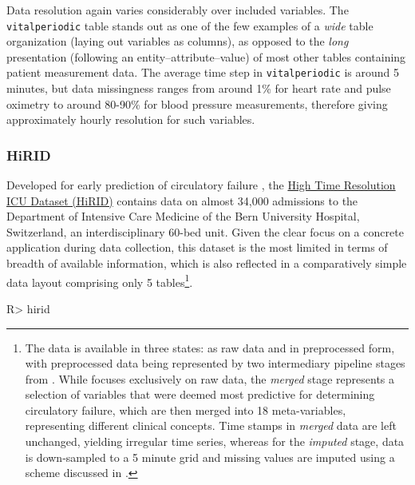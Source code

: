 \documentclass[
  notitle]{jss}
\begin{document}
Data resolution again varies considerably over included variables. The
\texttt{vitalperiodic} table stands out as one of the few examples of a
\emph{wide} table organization (laying out variables as columns), as
opposed to the \emph{long} presentation (following an
entity--attribute--value) of most other tables containing patient
measurement data. The average time step in \texttt{vitalperiodic} is
around 5 minutes, but data missingness ranges from around 1\% for heart
rate and pulse oximetry to around 80-90\% for blood pressure
measurements, therefore giving approximately hourly resolution for such
variables.

\hypertarget{hirid}{%
\subsubsection{HiRID}\label{hirid}}

Developed for early prediction of circulatory failure
\citep{hyland2020}, the
\href{https://physionet.org/content/hirid/1.0/}{High Time Resolution ICU
Dataset (HiRID)} contains data on almost 34,000 admissions to the
Department of Intensive Care Medicine of the Bern University Hospital,
Switzerland, an interdisciplinary 60-bed unit. Given the clear focus on
a concrete application during data collection, this dataset is the most
limited in terms of breadth of available information, which is also
reflected in a comparatively simple data layout comprising only 5
tables\footnote{The data is available in three states: as raw data and
  in preprocessed form, with preprocessed data being represented by two
  intermediary pipeline stages from \citep{hyland2020}. While 
  focuses exclusively on raw data, the \emph{merged} stage represents a
  selection of variables that were deemed most predictive for
  determining circulatory failure, which are then merged into 18
  meta-variables, representing different clinical concepts. Time stamps
  in \emph{merged} data are left unchanged, yielding irregular time
  series, whereas for the \emph{imputed} stage, data is down-sampled to
  a 5 minute grid and missing values are imputed using a scheme
  discussed in \citep{hyland2020}.}.

\begin{CodeChunk}
\begin{CodeInput}
R> hirid
\end{CodeInput}
\end{CodeChunk}
\end{document}
